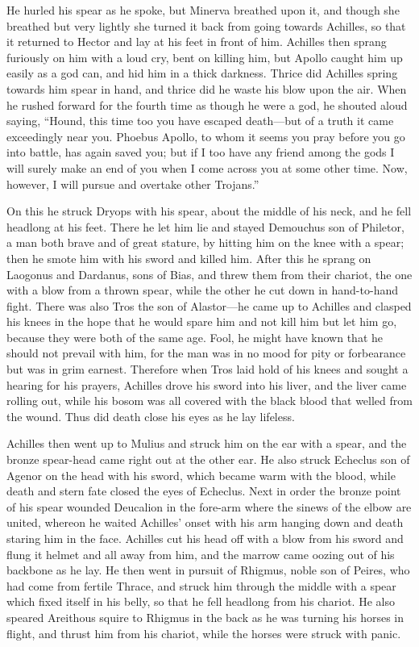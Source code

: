He hurled his spear as he spoke, but Minerva breathed upon it, and though
she breathed but very lightly she turned it back from going towards
Achilles, so that it returned to Hector and lay at his feet in front of
him. Achilles then sprang furiously on him with a loud cry, bent on
killing him, but Apollo caught him up easily as a god can, and hid him in
a thick darkness. Thrice did Achilles spring towards him spear in hand,
and thrice did he waste his blow upon the air. When he rushed forward for
the fourth time as though he were a god, he shouted aloud saying, “Hound,
this time too you have escaped death—but of a truth it came
exceedingly near you. Phoebus Apollo, to whom it seems you pray before you
go into battle, has again saved you; but if I too have any friend among
the gods I will surely make an end of you when I come across you at some
other time. Now, however, I will pursue and overtake other Trojans.”

On this he struck Dryops with his spear, about the middle of his neck, and
he fell headlong at his feet. There he let him lie and stayed Demouchus
son of Philetor, a man both brave and of great stature, by hitting him on
the knee with a spear; then he smote him with his sword and killed him.
After this he sprang on Laogonus and Dardanus, sons of Bias, and threw
them from their chariot, the one with a blow from a thrown spear, while
the other he cut down in hand-to-hand fight. There was also Tros the son
of Alastor—he came up to Achilles and clasped his knees in the hope
that he would spare him and not kill him but let him go, because they were
both of the same age. Fool, he might have known that he should not prevail
with him, for the man was in no mood for pity or forbearance but was in
grim earnest. Therefore when Tros laid hold of his knees and sought a
hearing for his prayers, Achilles drove his sword into his liver, and the
liver came rolling out, while his bosom was all covered with the black
blood that welled from the wound. Thus did death close his eyes as he lay
lifeless.

Achilles then went up to Mulius and struck him on the ear with a spear,
and the bronze spear-head came right out at the other ear. He also struck
Echeclus son of Agenor on the head with his sword, which became warm with
the blood, while death and stern fate closed the eyes of Echeclus. Next in
order the bronze point of his spear wounded Deucalion in the fore-arm
where the sinews of the elbow are united, whereon he waited Achilles’
onset with his arm hanging down and death staring him in the face.
Achilles cut his head off with a blow from his sword and flung it helmet
and all away from him, and the marrow came oozing out of his backbone as
he lay. He then went in pursuit of Rhigmus, noble son of Peires, who had
come from fertile Thrace, and struck him through the middle with a spear
which fixed itself in his belly, so that he fell headlong from his
chariot. He also speared Areithous squire to Rhigmus in the back as he was
turning his horses in flight, and thrust him from his chariot, while the
horses were struck with panic.

